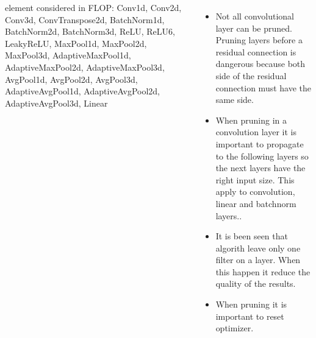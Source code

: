 \documentclass[25pt, a0paper,
               colspace=15mm, subcolspace=0mm,
               blockverticalspace=17mm, margin=1in, total={35in, 44in},
               landscape]{tikzposter} %
\begin{document}
\begin{columns}
{{\tiny element considered in FLOP: Conv1d, Conv2d, Conv3d, ConvTranspose2d, BatchNorm1d, BatchNorm2d, BatchNorm3d, ReLU, ReLU6, LeakyReLU, MaxPool1d, MaxPool2d, MaxPool3d, AdaptiveMaxPool1d, AdaptiveMaxPool2d, AdaptiveMaxPool3d, AvgPool1d, AvgPool2d, AvgPool3d, AdaptiveAvgPool1d, AdaptiveAvgPool2d, AdaptiveAvgPool3d, Linear}
  
  }


  {
  	\begin{itemize}
   \item Not all convolutional layer can be pruned. Pruning layers before a residual connection is dangerous because both side of the residual connection must have the same side.
  \item When pruning in a convolution layer it is important to propagate to the following layers so the next layers have the right input size. This apply to convolution, linear and batchnorm layers..
  \item It is been seen that algorith leave only one filter on a layer. When this happen it reduce the quality of the results.
  \item When pruning it is important to reset optimizer.
  \end{itemize}
\vspace{0.5cm}
  }

\end{columns}
\end{document}
